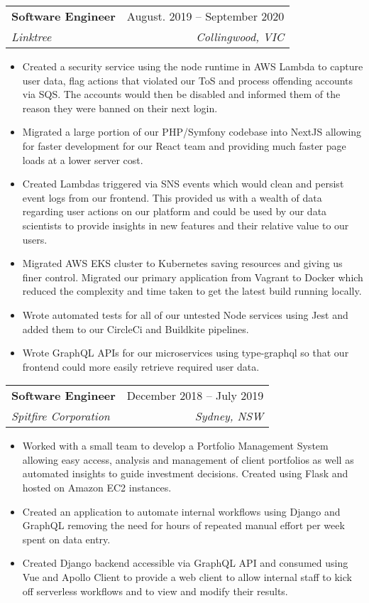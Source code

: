 \documentclass[letterpaper,11pt]{article}
\makeatletter
\newcommand{\resumeItem}[1]{
  \item\small{
    {#1 \vspace{1pt}}
  }
}
\newcommand{\resumeSubheading}[4]{
  \vspace{1pt}\item
    \begin{tabular*}{0.97\textwidth}[t]{l@{\extracolsep{\fill}}r}
      \textbf{#1} & #2 \\
      \textit{\small#3} & \textit{\small #4} \\
    \end{tabular*}\vspace{4pt}
}
\newcommand{\resumeSubSubheading}[2]{
    \item
    \begin{tabular*}{0.97\textwidth}{l@{\extracolsep{\fill}}r}
      \textit{\small#1} & \textit{\small #2} \\
    \end{tabular*}\vspace{4pt}
}
\newcommand{\resumeSubHeadingListEnd}{\end{itemize}}
\newcommand{\resumeItemListStart}{\begin{itemize}}
\newcommand{\resumeItemListEnd}{\end{itemize}\vspace{-5pt}}
\makeatother
\begin{document}

\resumeSubheading
{Software Engineer}{August. 2019 -- September 2020}
{Linktree}{Collingwood, VIC}
\resumeItemListStart
\resumeItem{Created a security service using the node runtime in AWS Lambda to capture user data, flag actions that violated our ToS and process offending accounts via SQS. The accounts would then be disabled and informed them of the reason they were banned on their next login.}
\resumeItem{Migrated a large portion of our PHP/Symfony codebase into NextJS allowing for faster development for our React team and providing much faster page loads at a lower server cost.}
\resumeItem{Created Lambdas triggered via SNS events which would clean and persist event logs from our frontend. This provided us with a wealth of data regarding user actions on our platform and could be used by our data scientists to provide insights in new features and their relative value to our users.}
\resumeItem{Migrated AWS EKS cluster to Kubernetes saving resources and giving us finer control. Migrated our primary application from Vagrant to Docker which reduced the complexity and time taken to get the latest build running locally.}
\resumeItem{Wrote automated tests for all of our untested Node services using Jest and added them to our CircleCi and Buildkite pipelines.}
\resumeItem{Wrote GraphQL APIs for our microservices using type-graphql so that our frontend could more easily retrieve required user data.}
\resumeItemListEnd

\resumeSubheading
{Software Engineer}{December 2018 -- July 2019}
{Spitfire Corporation}{Sydney, NSW}
\resumeItemListStart
\resumeItem{Worked with a small team to develop a Portfolio Management System allowing easy access, analysis and management of client portfolios as well as automated insights to guide investment decisions. Created using Flask and hosted on Amazon EC2 instances.}
\resumeItem{Created an application to automate internal workflows using Django and GraphQL removing the need for hours of repeated manual effort per week spent on data entry.}
\resumeItem{Created Django backend accessible via GraphQL API and consumed using Vue and Apollo Client to provide a web client to allow internal staff to kick off serverless workflows and to view and modify their results.}
\resumeItemListEnd
\end{document}

